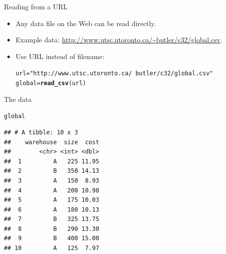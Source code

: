 \documentclass[unknownkeysallowed]{beamer}\usepackage[]{graphicx}\usepackage[]{color}
\makeatletter
\newcommand{\hlstr}[1]{\textcolor[rgb]{0.192,0.494,0.8}{#1}}%
\newcommand{\hlstd}[1]{\textcolor[rgb]{0.345,0.345,0.345}{#1}}%
\newcommand{\hlkwb}[1]{\textcolor[rgb]{0.69,0.353,0.396}{#1}}%
\newcommand{\hlkwd}[1]{\textcolor[rgb]{0.737,0.353,0.396}{\textbf{#1}}}%
\newenvironment{kframe}{%
 \def\at@end@of@kframe{}%
 \ifinner\ifhmode%
  \def\at@end@of@kframe{\end{minipage}}%
  \begin{minipage}{\columnwidth}%
 \fi\fi%
 \def\FrameCommand##1{\hskip\@totalleftmargin \hskip-\fboxsep
 \colorbox{shadecolor}{##1}\hskip-\fboxsep
     \hskip-\linewidth \hskip-\@totalleftmargin \hskip\columnwidth}%
 \MakeFramed {\advance\hsize-\width
   \@totalleftmargin\z@ \linewidth\hsize
   \@setminipage}}%
 {\par\unskip\endMakeFramed%
 \at@end@of@kframe}
\newenvironment{knitrout}{}{} %
\makeatother
\begin{document}
\begin{frame}[fragile]{Reading from a URL}
  
  \begin{itemize}
  \item Any data file on the Web can be read directly.
  \item Example data:
    \url{http://www.utsc.utoronto.ca/~butler/c32/global.csv}.
  \item Use URL instead of filename:
    
\begin{knitrout}
\color{fgcolor}\begin{kframe}
\begin{alltt}
\hlstd{url}\hlkwb{=}\hlstr{"http://www.utsc.utoronto.ca/~butler/c32/global.csv"}
\hlstd{global}\hlkwb{=}\hlkwd{read_csv}\hlstd{(url)}
\end{alltt}


{\ttfamily\noindent\itshape\color{messagecolor}{\#\# Parsed with column specification:\\\#\# cols(\\\#\#\ \  warehouse = col\_character(),\\\#\#\ \  size = col\_integer(),\\\#\#\ \  cost = col\_double()\\\#\# )}}\end{kframe}
\end{knitrout}
  \end{itemize}
  
\end{frame}

\begin{frame}[fragile]{The data}
  
\begin{knitrout}
\color{fgcolor}\begin{kframe}
\begin{alltt}
\hlstd{global}
\end{alltt}
\begin{verbatim}
## # A tibble: 10 x 3
##    warehouse  size  cost
##        <chr> <int> <dbl>
##  1         A   225 11.95
##  2         B   350 14.13
##  3         A   150  8.93
##  4         A   200 10.98
##  5         A   175 10.03
##  6         A   180 10.13
##  7         B   325 13.75
##  8         B   290 13.30
##  9         B   400 15.00
## 10         A   125  7.97
\end{verbatim}
\end{kframe}
\end{knitrout}
  
\end{frame}
\end{document}
